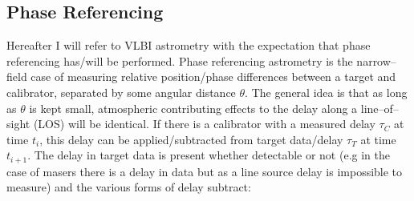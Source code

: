 	
	
	\subsection{Phase Referencing}\label{subsec:phasereferencing}
		Hereafter I will refer to VLBI astrometry with the expectation that phase referencing has/will be performed. Phase referencing astrometry is the narrow--field case of measuring relative position/phase differences between a target and calibrator, separated by some angular distance $\theta$. The general idea is that as long as $\theta$ is kept small, atmospheric contributing effects to the delay along a line--of--sight (LOS) will be identical. If there is a calibrator with a measured delay $\tau_C$ at time $t_i$, this delay can be applied/subtracted from target data/delay $\tau_T$ at time $t_{i+1}$. The delay in target data is present whether detectable or not (e.g in the case of masers there is a delay in data but as a line source delay is impossible to measure) and the various forms of delay subtract:
	
